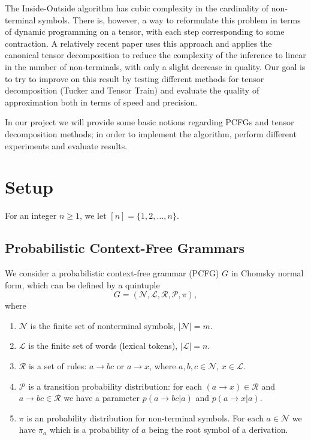 \documentclass[conference]{IEEEtran}
\begin{document}
The Inside-Outside algorithm has cubic complexity in the cardinality of non-terminal symbols. 
There is, however, a way to reformulate this problem in terms of dynamic programming on a tensor, with each step corresponding to some contraction. A relatively recent paper \cite{IEEEhowto:cohen} uses this approach and applies the canonical tensor decomposition to reduce the complexity of the inference to linear in the number of non-terminals, with only a slight decrease in quality. Our goal is to try to improve on this result by testing different methods for tensor decomposition (Tucker and Tensor Train) and evaluate the quality of approximation both in terms of speed and precision.

In our project we will provide some basic notions regarding PCFGs and tensor decomposition methods; in order to implement the algorithm, perform different experiments and evaluate results.

\section{Setup}

For an integer $n \geq 1$, we let $[n] = \{1, 2, \dots, n\}$.


\subsection{Probabilistic Context-Free Grammars}
We consider a probabilistic context-free grammar (PCFG) $G$ in Chomsky normal form, which can be defined by a quintuple
\begin{equation}
    G = (\mathcal{N}, \mathcal{L}, \mathcal{R},\mathcal P, \pi),
\end{equation}
where 

\begin{enumerate}
    \item $\mathcal{N}$ is the finite set of nonterminal symbols, $|\mathcal{N}| = m$.
    \item $\mathcal{L}$ is the finite set of words (lexical tokens), $| \mathcal{L}| = n$.
    \item $\mathcal{R}$ is a set of rules: $a \to bc$ or $a \to x$, where $a, b, c \in \mathcal{N}$, $x \in \mathcal{L}$.
    \item $\mathcal{P}$ is a transition probability distribution: for each $(a \to x) \in \mathcal{R}$ and $a\to bc \in \mathcal{R}$ we have a parameter $p(a \to bc | a)$ and $p(a\to x|a)$.
    \item $\pi$ is an probability distribution for non-terminal symbols. For each $a \in \mathcal{N}$ we have $\pi_a$ which is a probability of $a$ being the root symbol of a derivation. 
    
\end{enumerate}
\end{document}
